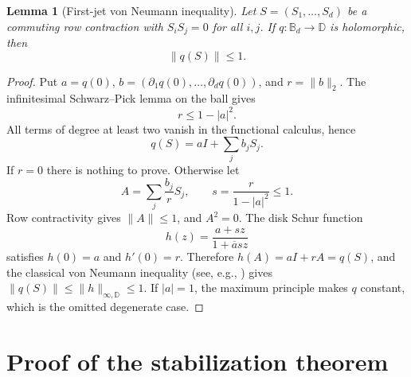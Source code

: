 \documentclass[11pt]{article}
\newtheorem{lemma}[theorem]{Lemma}
\theoremstyle{remark}
\newcommand{\B}{\mathbb B}
\newcommand{\D}{\mathbb D}
\begin{document}
\begin{lemma}[First-jet von Neumann inequality]\label{lem:squarezero}
Let $S=(S_1,\ldots,S_d)$ be a commuting row contraction with
$S_iS_j=0$ for all $i,j$.  If $q:\B_d\to\D$ is holomorphic, then
\[
 \|q(S)\|\leq1.
\]
\end{lemma}

\begin{proof}
Put $a=q(0)$, $b=(\partial_1q(0),\ldots,\partial_dq(0))$, and
$r=\|b\|_2$.  The infinitesimal Schwarz--Pick lemma on the ball \cite{Rudin}
gives
\begin{equation}\label{eq:SP}
 r\leq1-|a|^2.
\end{equation}
All terms of degree at least two vanish in the functional calculus, hence
\begin{equation}\label{eq:firstjet}
 q(S)=aI+\sum_jb_jS_j.
\end{equation}
If $r=0$ there is nothing to prove.  Otherwise let
\[
 A=\sum_j\frac{b_j}{r}S_j,
 \qquad s=\frac{r}{1-|a|^2}\leq1.
\]
Row contractivity gives $\|A\|\leq1$, and $A^2=0$.  The disk Schur function
\[
 h(z)=\frac{a+sz}{1+\overline a sz}
\]
satisfies $h(0)=a$ and $h'(0)=r$.  Therefore
$h(A)=aI+rA=q(S)$, and the classical von Neumann inequality (see, e.g.,
\cite[Section 1]{HRS}) gives
$\|q(S)\|\leq\|h\|_{\infty,\D}\leq1$.  If $|a|=1$, the maximum principle
makes $q$ constant, which is the omitted degenerate case.
\end{proof}

\section{Proof of the stabilization theorem}
\end{document}
